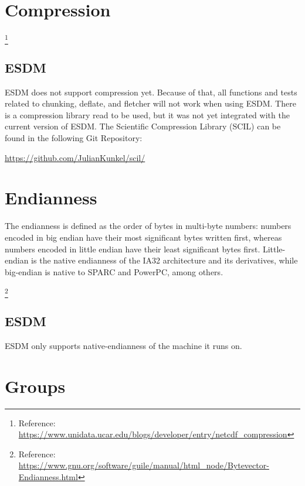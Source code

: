 \section{Compression}

\footnote{Reference: \url{https://www.unidata.ucar.edu/blogs/developer/entry/netcdf_compression}}

\subsection{ESDM}

\tab
ESDM does not support compression yet. Because of that, all functions and tests related to chunking, deflate, and fletcher will not work when using ESDM. There is a compression library read to be used, but it was not yet integrated with the current version of ESDM. The Scientific Compression Library (SCIL) can be found in the following Git Repository:

\begin{center}
\url{https://github.com/JulianKunkel/scil/}
\end{center}

\section{Endianness}

\tab
\begin{framed}

The endianness is defined as the order of bytes in multi-byte numbers: numbers encoded in big endian have their most significant bytes written first, whereas numbers encoded in little endian have their least significant bytes first. Little-endian is the native endianness of the IA32 architecture and its derivatives, while big-endian is native to SPARC and PowerPC, among others.

\footnote{Reference: \url{https://www.gnu.org/software/guile/manual/html_node/Bytevector-Endianness.html}}

\end{framed}

\subsection{ESDM}

\tab
ESDM only supports native-endianness of the machine it runs on.

\section{Groups}

